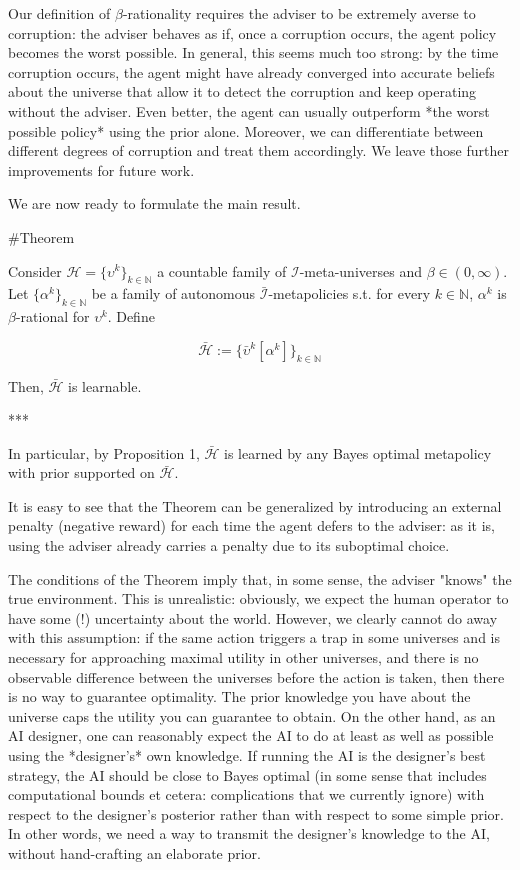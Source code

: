 \documentclass[a4paper]{article}
\newcommand{\Nats}{\mathbb{N}}
\newcommand{\I}{\mathcal{I}}
\newcommand{\Adi}{\bar{\I}}
\newcommand{\Hy}{\mathcal{H}}
\begin{document}
Our definition of $\beta$-rationality requires the adviser to be extremely averse to corruption: the adviser behaves as if, once a corruption occurs, the agent policy becomes the worst possible. In general, this seems much too strong: by the time corruption occurs, the agent might have already converged into accurate beliefs about the universe that allow it to detect the corruption and keep operating without the adviser. Even better, the agent can usually outperform *the worst possible policy* using the prior alone. Moreover, we can differentiate between different degrees of corruption and treat them accordingly. We leave those further improvements for future work.

We are now ready to formulate the main result.

\#Theorem

Consider $\Hy = \{\upsilon^k\}_{k \in \Nats}$ a countable family of $\I$-meta-universes and $\beta \in (0,\infty)$. Let $\{\alpha^k\}_{k \in \Nats}$ be a family of autonomous $\Adi$-metapolicies s.t. for every $k \in \Nats$, $\alpha^k$ is $\beta$-rational for $\upsilon^k$. Define 

$$\bar{\Hy}:=\{\bar{\upsilon}^k[\alpha^k]\}_{k \in \Nats}$$

Then, $\bar{\Hy}$ is learnable.

***

In particular, by Proposition 1, $\bar{\Hy}$ is learned by any Bayes optimal metapolicy with prior supported on $\bar{\Hy}$.

It is easy to see that the Theorem can be generalized by introducing an external penalty (negative reward) for each time the agent defers to the adviser: as it is, using the adviser already carries a penalty due to its suboptimal choice.

The conditions of the Theorem imply that, in some sense, the adviser "knows" the true environment. This is unrealistic: obviously, we expect the human operator to have some (!) uncertainty about the world. However, we clearly cannot do away with this assumption: if the same action triggers a trap in some universes and is necessary for approaching maximal utility in other universes, and there is no observable difference between the universes before the action is taken, then there is no way to guarantee optimality. The prior knowledge you have about the universe caps the utility you can guarantee to obtain. On the other hand, as an AI designer, one can reasonably expect the AI to do at least as well as possible using the *designer's* own knowledge. If running the AI is the designer's best strategy, the AI should be close to Bayes optimal (in some sense that includes computational bounds et cetera: complications that we currently ignore) with respect to the designer's posterior rather than with respect to some simple prior. In other words, we need a way to transmit the designer's knowledge to the AI, without hand-crafting an elaborate prior.
\end{document}
